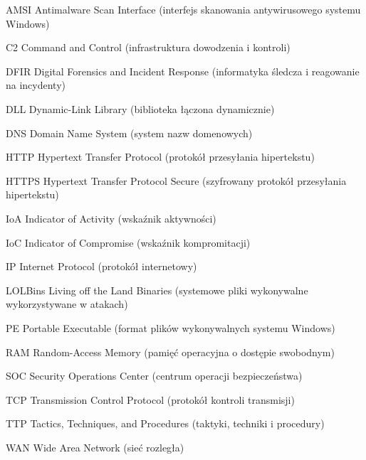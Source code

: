 \UnnumberedChapter{\abbrevname}

\begin{abbreviations}
    \item[AMSI]    Antimalware Scan Interface (interfejs skanowania antywirusowego systemu Windows)
    \item[C2]      Command and Control (infrastruktura dowodzenia i kontroli)
    \item[DFIR]    Digital Forensics and Incident Response (informatyka śledcza i reagowanie na incydenty)
    \item[DLL]     Dynamic-Link Library (biblioteka łączona dynamicznie)
    \item[DNS]     Domain Name System (system nazw domenowych)
    \item[HTTP]    Hypertext Transfer Protocol (protokół przesyłania hipertekstu)
    \item[HTTPS]   Hypertext Transfer Protocol Secure (szyfrowany protokół przesyłania hipertekstu)
    \item[IoA]     Indicator of Activity (wskaźnik aktywności)
    \item[IoC]     Indicator of Compromise (wskaźnik kompromitacji)
    \item[IP]      Internet Protocol (protokół internetowy)
    \item[LOLBins] Living off the Land Binaries (systemowe pliki wykonywalne wykorzystywane w atakach)
    \item[PE]      Portable Executable (format plików wykonywalnych systemu Windows)
    \item[RAM]     Random-Access Memory (pamięć operacyjna o dostępie swobodnym)
    \item[SOC]     Security Operations Center (centrum operacji bezpieczeństwa)
    \item[TCP]     Transmission Control Protocol (protokół kontroli transmisji)
    \item[TTP]     Tactics, Techniques, and Procedures (taktyki, techniki i procedury)
    \item[WAN]     Wide Area Network (sieć rozległa)
\end{abbreviations}
